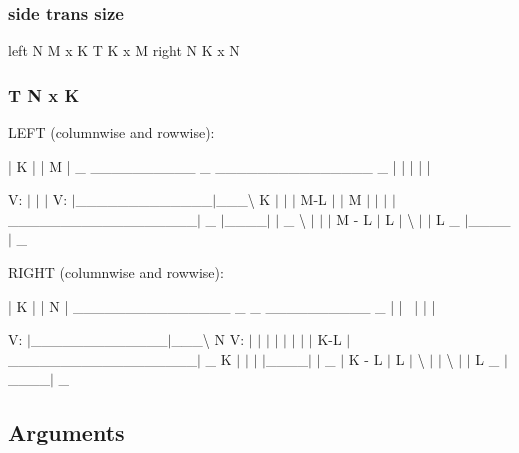  \subsubsection*{side trans size }

left N M x K T K x M right N K x N \subsubsection*{T N x K }

L\+E\+F\+T (columnwise and rowwise)\+: \begin{DoxyVerb}        |    K    |                 |         M         |
     _  __________   _              _______________        _
        |    |    |                 |             | \
\end{DoxyVerb}
 V\+: $\vert$ $\vert$ $\vert$ V\textquotesingle{}\+: $\vert$\+\_\+\+\_\+\+\_\+\+\_\+\+\_\+\+\_\+\+\_\+\+\_\+\+\_\+\+\_\+\+\_\+\+\_\+\+\_\+$\vert$\+\_\+\+\_\+\+\_\+\textbackslash{} K $\vert$ $\vert$ $\vert$ M-\/\+L $\vert$ $\vert$ M $\vert$ $\vert$ $\vert$ $\vert$\+\_\+\+\_\+\+\_\+\+\_\+\+\_\+\+\_\+\+\_\+\+\_\+\+\_\+\+\_\+\+\_\+\+\_\+\+\_\+\+\_\+\+\_\+\+\_\+\+\_\+\+\_\+$\vert$ \+\_\+ $\vert$\+\_\+\+\_\+\+\_\+\+\_\+$\vert$ $\vert$ \+\_\+ \textbackslash{} $\vert$ $\vert$ $\vert$ M -\/ L $\vert$ L $\vert$ \textbackslash{} $\vert$ $\vert$ L \+\_\+ $|$\+\_\+\+\_\+\+\_\+\+\_\+$\vert$ \+\_\+

R\+I\+G\+H\+T (columnwise and rowwise)\+: \begin{DoxyVerb}    |         K         |                   |    N    |
    _______________        _             _  __________   _
    |             | \                       |    |    |
\end{DoxyVerb}
 V\textquotesingle{}\+: $\vert$\+\_\+\+\_\+\+\_\+\+\_\+\+\_\+\+\_\+\+\_\+\+\_\+\+\_\+\+\_\+\+\_\+\+\_\+\+\_\+$\vert$\+\_\+\+\_\+\+\_\+\textbackslash{} N V\+: $\vert$ $\vert$ $\vert$ $\vert$ $\vert$ $\vert$ $\vert$ $\vert$ K-\/\+L $\vert$\+\_\+\+\_\+\+\_\+\+\_\+\+\_\+\+\_\+\+\_\+\+\_\+\+\_\+\+\_\+\+\_\+\+\_\+\+\_\+\+\_\+\+\_\+\+\_\+\+\_\+\+\_\+$\vert$ \+\_\+ K $\vert$ $\vert$ $\vert$ $\vert$\+\_\+\+\_\+\+\_\+\+\_\+$\vert$ $\vert$ \+\_\+ $\vert$ K -\/ L $\vert$ L $\vert$ \textbackslash{} $\vert$ $\vert$ \textbackslash{} $\vert$ $\vert$ L \+\_\+ $|$\+\_\+\+\_\+\+\_\+\+\_\+$\vert$ \+\_\+

\subsection*{Arguments }


